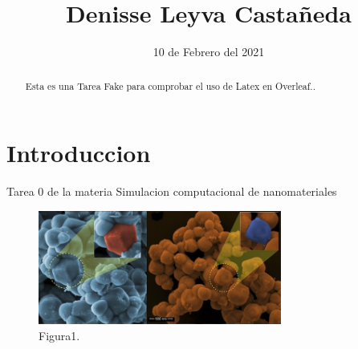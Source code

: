 \documentclass{article}
\title{Denisse Leyva Castañeda}
\date{} %
\begin{document}
\maketitle

\begin{abstract} 
\noindent Esta es una Tarea Fake para comprobar el uso de Latex en Overleaf..  \end{abstract}


\section{Introduccion}
Tarea 0 de la materia Simulacion computacional de nanomateriales


\begin{figure}[H]
\centering
\includegraphics[width=80mm]{imagen.jpg}
\caption{\label{fig1}Figura1.}
\end{figure}


\date {10 de Febrero del 2021} 
\centering
\end{document}
